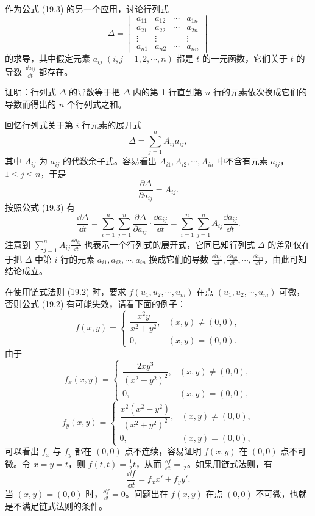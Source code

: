 作为公式 (19.3) 的另一个应用，讨论行列式
\[
  \Delta=
  \begin{vmatrix}
    a_{11}&a_{12}&\cdots&a_{1n}\\
    a_{21}&a_{22}&\cdots&a_{2n}\\
    \vdots&\vdots&&\vdots\\
    a_{n1}&a_{n2}&\cdots&a_{nn}
  \end{vmatrix}
\]
的求导，其中假定元素 $a_{ij}$ $(i,j=1,2,\cdots,n)$ 都是 $t$ 的一元函数，它们关于 $t$ 的导数 $\frac{\dd a_{ij}}{\dd t}$ 都存在。

\begin{xexample}[19.3.2]
证明：行列式 $\Delta$ 的导数等于把 $\Delta$ 内的第 1 行直到第 $n$ 行的元素依次换成它们的导数而得出的 $n$ 个行列式之和。
\end{xexample}
\begin{xproof}
回忆行列式关于第 $i$ 行元素的展开式
\[
  \Delta=\sum_{j=1}^n A_{ij}a_{ij},
\]
其中 $A_{ij}$ 为 $a_{ij}$ 的代数余子式。容易看出 $A_{i1},A_{i2},\cdots,A_{in}$ 中不含有元素 $a_{ij}$，$1\le j\le n$，于是
\[
  \frac{\partial\Delta}{\partial a_{ij}}=A_{ij}.
\]
按照公式 (19.3) 有
\[
  \frac{\dd\Delta}{\dd t}
  =\sum_{i=1}^n\sum_{j=1}^n\frac{\partial\Delta}{\partial a_{ij}}\cdot\frac{\dd a_{ij}}{\dd t}
  =\sum_{i=1}^n\sum_{j=1}^n A_{ij}\frac{\dd a_{ij}}{\dd t}.
\]
注意到 $\sum_{j=1}^n A_{ij}\frac{\dd a_{ij}}{\dd t}$ 也表示一个行列式的展开式，它同已知行列式 $\Delta$ 的差别仅在于把 $\Delta$ 中第 $i$ 行的元素 $a_{i1},a_{i2},\cdots,a_{in}$ 换成它们的导数 $\frac{\dd a_{i1}}{\dd t},\frac{\dd a_{i2}}{\dd t},\cdots,\frac{\dd a_{in}}{\dd t}$，由此可知结论成立。
\end{xproof}

\begin{xremark}
在使用链式法则 (19.2) 时，要求 $f(u_1,u_2,\cdots,u_m)$ 在点 $(u_1,u_2,\cdots,u_m)$ 可微，否则公式 (19.2) 有可能失效，请看下面的例子：
\[
  f(x,y)=
  \begin{cases}
    \dfrac{x^2y}{x^2+y^2}, & (x,y)\ne(0,0),\\
    0, & (x,y)=(0,0).
  \end{cases}
\]
由于
\[
  f_x(x,y)=
  \begin{cases}
    \dfrac{2xy^3}{(x^2+y^2)^2}, & (x,y)\ne(0,0),\\
    0, & (x,y)=(0,0),
  \end{cases}
\]
\[
  f_y(x,y)=
  \begin{cases}
    \dfrac{x^2(x^2-y^2)}{(x^2+y^2)^2}, & (x,y)\ne(0,0),\\
    0, & (x,y)=(0,0),
  \end{cases}
\]
可以看出 $f_x$ 与 $f_y$ 都在 $(0,0)$ 点不连续，容易证明 $f(x,y)$ 在 $(0,0)$ 点不可微。令 $x=y=t$，则 $f(t,t)=\frac12t$，从而 $\frac{\dd f}{\dd t}=\frac12$。如果用链式法则，有
\[
  \frac{\dd f}{\dd t}=f_xx'+f_yy'.
\]
当 $(x,y)=(0,0)$ 时，$\frac{\dd f}{\dd t}=0$。问题出在 $f(x,y)$ 在点 $(0,0)$ 不可微，也就是不满足链式法则的条件。
\end{xremark}

